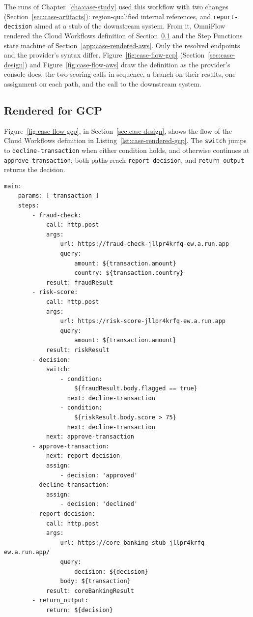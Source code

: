 The runs of Chapter~\ref{cha:case-study} used this workflow with two changes
(Section~\ref{sec:case-artifacts}): region-qualified internal references, and
\texttt{report-decision} aimed at a stub of the downstream system. From it, OmniFlow rendered the
Cloud Workflows definition of Section~\ref{app:case-rendered-gcp} and the Step Functions state
machine of Section~\ref{app:case-rendered-aws}. Only the resolved endpoints and the provider's syntax differ.
Figure~\ref{fig:case-flow-gcp} (Section~\ref{sec:case-design}) and Figure~\ref{fig:case-flow-aws}
draw the definition as the provider's console does: the two scoring calls in sequence, a branch on
their results, one assignment on each path, and the call to the downstream system.

\subsection{Rendered for GCP}
\label{app:case-rendered-gcp}

Figure~\ref{fig:case-flow-gcp}, in Section~\ref{sec:case-design}, shows the flow of the Cloud
Workflows definition in Listing~\ref{lst:case-rendered-gcp}. The \texttt{switch} jumps to \texttt{decline-transaction} when
either condition holds, and otherwise continues at \texttt{approve-transaction}; both paths reach
\texttt{report-decision}, and \texttt{return\_output} returns the decision.

\begin{lstlisting}[language={},caption={Cloud Workflows definition rendered for GCP (YAML).},label={lst:case-rendered-gcp},basicstyle=\ttfamily\fontsize{7.2}{8.6}\selectfont,breaklines=true]
main:
    params: [ transaction ]
    steps:
        - fraud-check:
            call: http.post
            args:
                url: https://fraud-check-jllpr4krfq-ew.a.run.app
                query:
                    amount: ${transaction.amount}
                    country: ${transaction.country}
            result: fraudResult
        - risk-score:
            call: http.post
            args:
                url: https://risk-score-jllpr4krfq-ew.a.run.app
                query:
                    amount: ${transaction.amount}
            result: riskResult
        - decision:
            switch:
                - condition:
                    ${fraudResult.body.flagged == true}
                  next: decline-transaction
                - condition:
                    ${riskResult.body.score > 75}
                  next: decline-transaction
            next: approve-transaction
        - approve-transaction:
            next: report-decision
            assign:
                - decision: 'approved'
        - decline-transaction:
            assign:
                - decision: 'declined'
        - report-decision:
            call: http.post
            args:
                url: https://core-banking-stub-jllpr4krfq-ew.a.run.app/
                query:
                    decision: ${decision}
                body: ${transaction}
            result: coreBankingResult
        - return_output:
            return: ${decision}
\end{lstlisting}

